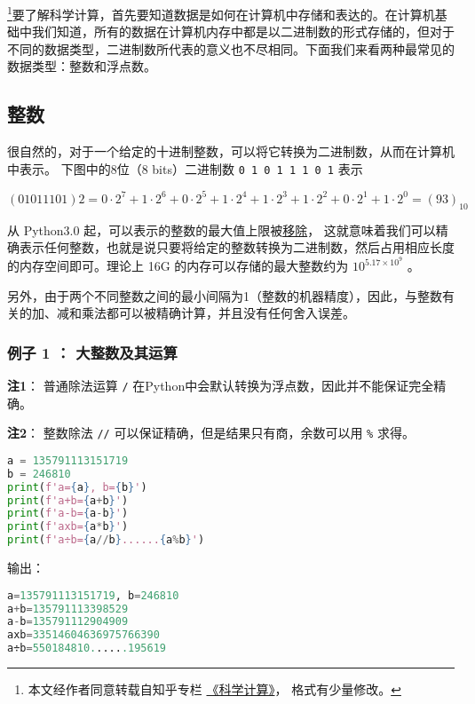 

\footnote{本文经作者同意转载自知乎专栏 \href{https://www.zhihu.com/column/c_1226443594048942080}{《科学计算》}， 格式有少量修改。}要了解科学计算，首先要知道数据是如何在计算机中存储和表达的。在计算机基础中我们知道，所有的数据在计算机内存中都是以二进制数的形式存储的，但对于不同的数据类型，二进制数所代表的意义也不尽相同。下面我们来看两种最常见的数据类型：整数和浮点数。

\subsection{整数}

很自然的，对于一个给定的十进制整数，可以将它转换为二进制数，从而在计算机中表示。 下图中的8位（8 bits）二进制数 \verb|0 1 0 1 1 1 0 1| 表示

\begin{equation}
(01011101)2=0\cdot2^7+1\cdot2^6+0\cdot2^5+1\cdot2^4+1\cdot2^3+1\cdot2^2+0\cdot2^1+1\cdot2^0=(93)_{10}
\end{equation}

从 Python3.0 起，可以表示的整数的最大值上限被\href{https://docs.python.org/3.1/whatsnew/3.0.html#integers}{移除}， 这就意味着我们可以精确表示任何整数，也就是说只要将给定的整数转换为二进制数，然后占用相应长度的内存空间即可。理论上 16G 的内存可以存储的最大整数约为  $10^{5.17\times10^9}$  。

另外，由于两个不同整数之间的最小间隔为1（整数的机器精度），因此，与整数有关的加、减和乘法都可以被精确计算，并且没有任何舍入误差。

\subsubsection{例子 1 ： 大整数及其运算}

\textbf{注1}： 普通除法运算  \verb|/|  在Python中会默认转换为浮点数，因此并不能保证完全精确。

\textbf{注2}： 整数除法 \verb|//| 可以保证精确，但是结果只有商，余数可以用 \verb|%|  求得。

\begin{lstlisting}[language=python]
a = 135791113151719
b = 246810
print(f'a={a}, b={b}')
print(f'a+b={a+b}')
print(f'a-b={a-b}')
print(f'axb={a*b}')
print(f'a÷b={a//b}......{a%b}')
\end{lstlisting}
输出：
\begin{lstlisting}[language=python]
a=135791113151719, b=246810 
a+b=135791113398529 
a-b=135791112904909 
axb=33514604636975766390 
a÷b=550184810......195619
\end{lstlisting}


